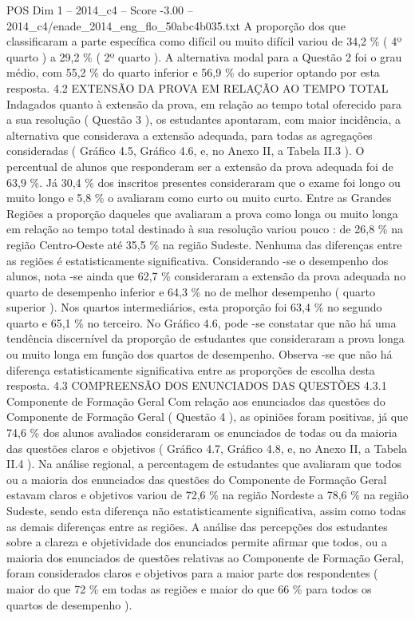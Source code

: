 \begin{textsample}{POS Dim 1 – 2014\_c4 – Score -3.00 – 2014\_c4/enade\_2014\_eng\_flo\_50abc4b035.txt}
A proporção dos que classificaram a parte específica como difícil ou muito difícil variou de 34,2 \% ( 4º quarto ) a 29,2 \% ( 2º quarto ).
A alternativa modal para a Questão 2 foi o grau médio, com 55,2 \% do quarto inferior e 56,9 \% do superior optando por esta resposta. 4.2 EXTENSÃO DA PROVA EM RELAÇÃO AO TEMPO TOTAL Indagados quanto à extensão da prova, em relação ao tempo total oferecido para a sua resolução ( Questão 3 ), os estudantes apontaram, com maior incidência, a alternativa que considerava a extensão adequada, para todas as agregações consideradas ( Gráfico 4.5, Gráfico 4.6, e, no Anexo II, a Tabela II.3 ).
O percentual de alunos que responderam ser a extensão da prova adequada foi de 63,9 \%.
Já 30,4 \% dos inscritos presentes consideraram que o exame foi longo ou muito longo e 5,8 \% o avaliaram como curto ou muito curto.
Entre as Grandes Regiões a proporção daqueles que avaliaram a prova como longa ou muito longa em relação ao tempo total destinado à sua resolução variou pouco : de 26,8 \% na região Centro-Oeste até 35,5 \% na região Sudeste.
Nenhuma das diferenças entre as regiões é estatisticamente significativa.
Considerando -se o desempenho dos alunos, nota -se ainda que 62,7 \% consideraram a extensão da prova adequada no quarto de desempenho inferior e 64,3 \% no de melhor desempenho ( quarto superior ).
Nos quartos intermediários, esta proporção foi 63,4 \% no segundo quarto e 65,1 \% no terceiro.
No Gráfico 4.6, pode -se constatar que não há uma tendência discernível da proporção de estudantes que consideraram a prova longa ou muito longa em função dos quartos de desempenho.
Observa -se que não há diferença estatisticamente significativa entre as proporções de escolha desta resposta. 4.3 COMPREENSÃO DOS ENUNCIADOS DAS QUESTÕES 4.3.1 Componente de Formação Geral Com relação aos enunciados das questões do Componente de Formação Geral ( Questão 4 ), as opiniões foram positivas, já que 74,6 \% dos alunos avaliados consideraram os enunciados de todas ou da maioria das questões claros e objetivos ( Gráfico 4.7, Gráfico 4.8, e, no Anexo II, a Tabela II.4 ).
Na análise regional, a percentagem de estudantes que avaliaram que todos ou a maioria dos enunciados das questões do Componente de Formação Geral estavam claros e objetivos variou de 72,6 \% na região Nordeste a 78,6 \% na região Sudeste, sendo esta diferença não estatisticamente significativa, assim como todas as demais diferenças entre as regiões.
A análise das percepções dos estudantes sobre a clareza e objetividade dos enunciados permite afirmar que todos, ou a maioria dos enunciados de questões relativas ao Componente de Formação Geral, foram considerados claros e objetivos para a maior parte dos respondentes ( maior do que 72 \% em todas as regiões e maior do que 66 \% para todos os quartos de desempenho ).

\end{textsample}
